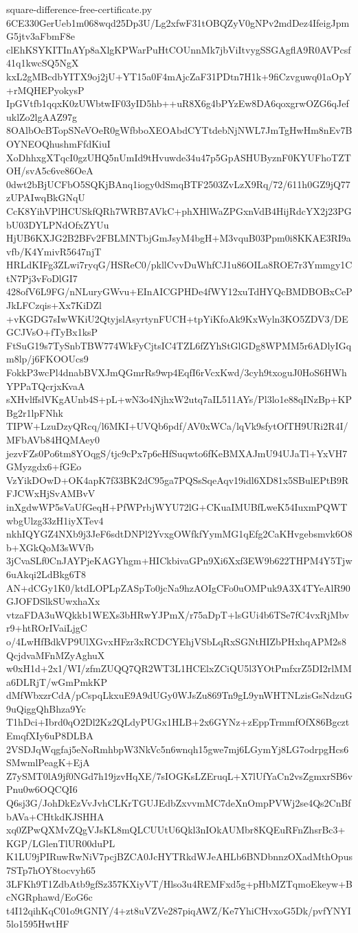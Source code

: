 \documentclass[11pt]{article}
\theoremstyle{definition}
\theoremstyle{remark}
\begin{document}
\begin{filecontents*}[overwrite]{square-difference-free-certificate.py}
6CE330GerUeb1m068wqd25Dp3U/Lg2xfwF31tOBQZyV0gNPv2mdDez4IfeigJpmG5jtv3aFbmF8e
clEhKSYKITInAYp8aXlgKPWarPuHtCOUnnMk7jbViItvygSSGAgflA9R0AVPcsf41q1kwcSQ5NgX
kxL2gMBcdbYITX9oj2jU+YT15a0F4mAjcZaF31PDtn7H1k+9fiCzvguwq01aOpY+rMQHEPyokysP
IpGVtfb1qqxK0zUWbtwIF03yID5hb++uR8X6g4bPYzEw8DA6qoxgrwOZG6qJefuklZo2lgAAZ97g
8OAlbOcBTopSNeVOeR0gWfbboXEOAbdCYTtdebNjNWL7JmTgHwHm8nEv7BOYNEOQhushmFfdKiuI
XoDhhxgXTqcI0gzUHQ5nUmId9tHvuwde34u47p5GpASHUByznF0KYUFhoTZTOH/svA5c6ve86OeA
0dwt2bBjUCFbO5SQKjBAnq1iogy0dSmqBTF2503ZvLzX9Rq/72/611h0GZ9jQ77zUPAIwqBkGNqU
CcK8YihVPlHCUSkfQRh7WRB7AVkC+phXHlWaZPGxnVdB4HijRdcYX2j23PGbU03DYLPNdOfxZYUu
HjUB6KXJG2B2BFv2FBLMNTbjGmJsyM4bgH+M3vquB03Ppm0i8KKAE3RI9avfb/K4YmivR5647njT
HRLdKIFg3ZLwi7ryqG/HSReC0/pkllCvvDuWhfCJ1u86OILa8ROE7r3Ymmgy1CtN7Pj3vFoDlGI7
428ofV6L9FG/nNLuryGWvu+EInAICGPHDe4fWY12xuTdHYQcBMDBOBxCePJkLFCzqis+Xx7KiDZl
+vKGDG7sIwWKiU2QtyjslAsyrtynFUCH+tpYiKfoAk9KxWyln3KO5ZDV3/DEGCJVsO+fTyBx1ksP
FtSuG19s7TySnbTBW774WkFyCjtsIC4TZL6fZYhStGlGDg8WPMM5r6ADlyIGqm8lp/j6FKOOUcs9
FokkP3wcPl4dnabBVXJmQGmrRs9wp4EqfI6rVcxKwd/3cyh9txoguJ0HoS6HWhYPPaTQcrjxKvaA
sXHvlffslVKgAUnb4S+pL+wN3o4NjhxW2utq7aIL511AYs/Pl3lo1e88qINzBp+KPBg2r1lpFNhk
TIPW+LzuDzyQRcq/l6MKI+UVQb6pdf/AV0xWCa/lqVk9sfytOfTH9URi2R4I/MFbAVb84HQMAey0
jezvFZs0Po6tm8YOqgS/tjc9cPx7p6eHfSuqwto6fKeBMXAJmU94UJaTl+YxVH7GMyzgdx6+fGEo
VzYikDOwD+OK4apK7f33BK2dC95ga7PQSsSqeAqv19idl6XD81x5SBulEPtB9RFJCWxHjSvAMBvV
inXgdwWP5sVaUfGeqH+PfWPrbjWYU72lG+CKuaIMUBfLweK54IuxmPQWTwbgUlzg33zH1iyXTev4
nkhIQYGZ4NXb9j3JeF6sdtDNPl2YvxgOWfkfYymMG1qEfg2CaKHvgebsmvk6O8b+XGkQoM3sWVfb
3jCvaSLf0CnJAYPjeKAGYhgm+HICkbivaGPn9Xi6Xxf3EW9b622THPM4Y5Tjw6uAkqi2LdBkg6T8
AN+dCGy1K0/ktdLOPLpZASpTo0jcNa9hzAOIgCFo0uOMPuk9A3X4TYeAlR90GJOFDSlkSUwxhaXx
vtzaFDA3uWQkkb1WEXs3bHRwYJPmX/r75aDpT+lsGUi4b6TSe7fC4vxRjMbvr9+htROrIVaiLjgC
o/4LwHfBdkVP9UlXGvxHFzr3xRCDCYEhjVSbLqRxSGNtHIZbPHxhqAPM2s8QcjdvaMFnMZyAghuX
w0xH1d+2x1/WI/zfmZUQQ7QR2WT3L1HCElxZCiQU5l3YOtPmfxrZ5DI2rlMMa6DLRjT/wGmPmkKP
dMfWbxzrCdA/pCspqLkxuE9A9dUGy0WJsZu869Tn9gL9ynWHTNLzisGsNdzuG9uQiggQhBhza9Yc
T1hDci+Ibrd0qO2Dl2Kz2QLdyPUGx1HLB+2x6GYNz+zEppTrmmfOfX86BgcztEmqfXIy6uP8DLBA
2VSDJqWqgfaj5eNoRmhbpW3NkVc5n6wnqh15gwe7mj6LGymYj8LG7odrpgHcs6SMwmlPeagK+EjA
Z7ySMT0lA9jf0NGd7h19jzvHqXE/7sIOGKsLZEruqL+X7lUfYaCn2vsZgmxrSB6vPnu0w6OQCQI6
Q6sj3G/JohDkEzVvJvhCLKrTGUJEdbZxvvmMC7deXnOmpPVWj2se4Qs2CnBfbAVa+CHtkdKJSHHA
xq0ZPwQXMvZQgVJsKL8mQLCUUtU6Qkl3nIOkAUMbr8KQEuRFnZhsrBc3+KGP/LGlenTlUR00duPL
K1LU9jPIRuwRwNiV7pcjBZCA0JcHYTRkdWJeAHLb6BNDbnnzOXadMthOpus7STp7hOY8tocvyh65
3LFKh9T1ZdbAtb9gfSz357KXiyVT/Hlso3u4REMFxd5g+pHbMZTqmoEkeyw+BcNGRphawd/EoG6c
t4I12qihKqC01o9tGNIY/4+zt8uVZVe287piqAWZ/Ke7YhiCHvxoG5Dk/pvfYNYI5lo1595HwtHF

\end{filecontents*}
\end{document}
